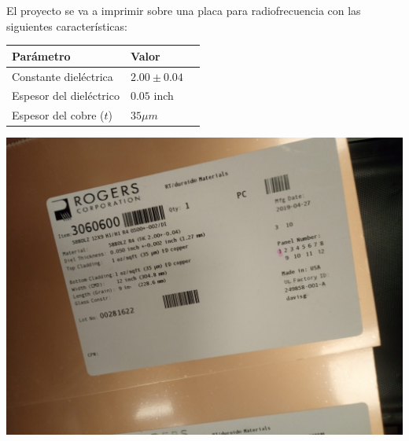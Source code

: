\documentclass[a4paper, 12pt]{article}
\begin{document}
\begin{minipage}{0.66\linewidth}
  El proyecto se va a imprimir sobre una placa para radiofrecuencia con las siguientes características:
  \begin{tabular}{|l|l|l|}
  \hline
  Parámetro & Valor & \\ \hline
  Constante dieléctrica & $2.00 \pm 0.04$ & \\ \hline
  Espesor del dieléctrico & $0.05$ inch & \\ \hline
  Espesor del cobre ($t$) & $35 \mu m$ & \\ \hline
  \end{tabular}
\end{minipage}
\begin{minipage}{0.32\linewidth}
  \includegraphics[width=\linewidth]{./img/sustrato.jpg}
\end{minipage}
\end{document}
